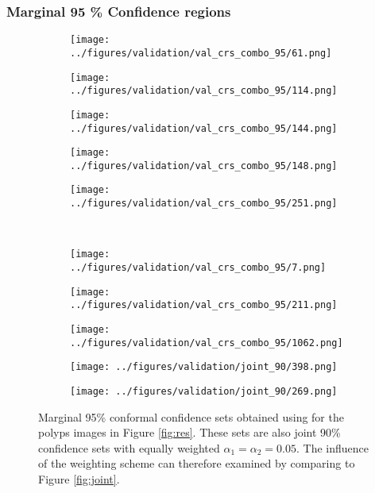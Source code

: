 \subsubsection{Marginal 95 \% Confidence regions}

\begin{figure}[h!]
	\begin{subfigure}{0.19\textwidth}
		\centering
		\texttt{[image: ../figures/validation/val\_crs\_combo\_95/61.png]}
		\label{fig:1}
	\end{subfigure}
	\begin{subfigure}{0.19\textwidth}
		\centering
		\texttt{[image: ../figures/validation/val\_crs\_combo\_95/114.png]}
		\label{fig:1}
	\end{subfigure}
	\begin{subfigure}{0.19\textwidth}
		\centering
		\texttt{[image: ../figures/validation/val\_crs\_combo\_95/144.png]}
		\label{fig:1}
	\end{subfigure}
	\begin{subfigure}{0.19\textwidth}
		\centering
		\texttt{[image: ../figures/validation/val\_crs\_combo\_95/148.png]}
		\label{fig:1}
	\end{subfigure}
	\begin{subfigure}{0.19\textwidth}
		\centering
		\texttt{[image: ../figures/validation/val\_crs\_combo\_95/251.png]}
		\label{fig:1}
	\end{subfigure}
	\vspace{-0.35cm}
	\\
	\begin{subfigure}{0.19\textwidth}
		\centering
		\texttt{[image: ../figures/validation/val\_crs\_combo\_95/7.png]}
		\label{fig:1}
	\end{subfigure}
	\begin{subfigure}{0.19\textwidth}
		\centering
		\texttt{[image: ../figures/validation/val\_crs\_combo\_95/211.png]}
		\label{fig:1}
	\end{subfigure}
	\begin{subfigure}{0.19\textwidth}
		\centering
		\texttt{[image: ../figures/validation/val\_crs\_combo\_95/1062.png]}
		\label{fig:1}
	\end{subfigure}
	\begin{subfigure}{0.19\textwidth}
		\centering
		\texttt{[image: ../figures/validation/joint\_90/398.png]}
		\label{fig:1}
	\end{subfigure}
	\begin{subfigure}{0.19\textwidth}
		\centering
		\texttt{[image: ../figures/validation/joint\_90/269.png]}
		\label{fig:1}
	\end{subfigure}
	\label{fig:grid}
	\caption{Marginal 95\% conformal confidence sets obtained using for the polyps images in Figure \ref{fig:res}. These sets are also joint 90\% confidence sets with equally weighted $\alpha_1 = \alpha_2 = 0.05$. The influence of the weighting scheme can therefore examined by comparing to Figure \ref{fig:joint}.}\label{fig:joint3}
\end{figure}
\newpage
